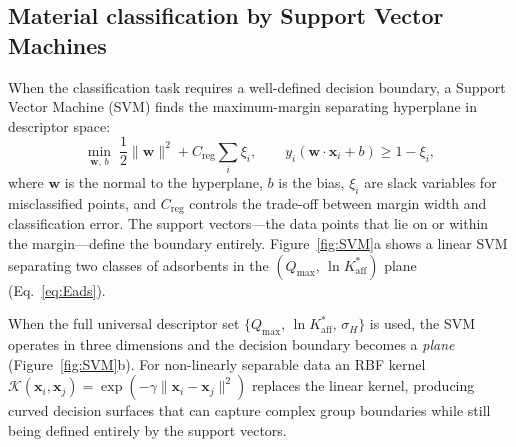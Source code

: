 \documentclass[journal=jacsat,manuscript=article]{achemso}
\begin{document}
	\subsection{Material classification by Support Vector Machines}
	\label{sec:SVM}

	When the classification task requires a well-defined decision boundary, a Support Vector Machine (SVM) finds the maximum-margin separating hyperplane in descriptor space:
	\begin{equation}
		\min_{\mathbf{w},\,b}\;
		\frac{1}{2}\|\mathbf{w}\|^2
		+ C_{\mathrm{reg}}\sum_{i}\xi_i,
		\qquad
		y_i(\mathbf{w}\cdot\mathbf{x}_i + b) \ge 1 - \xi_i,
		\label{eq:SVM}
	\end{equation}
	where $\mathbf{w}$ is the normal to the hyperplane, $b$ is the bias, $\xi_i$ are slack variables for misclassified points, and $C_{\mathrm{reg}}$ controls the trade-off between margin width and classification error. The support vectors---the data points that lie on or within the margin---define the boundary entirely. Figure~\ref{fig:SVM}a shows a linear SVM separating two classes of adsorbents in the $(Q_{\max},\, \ln K_{\mathrm{aff}}^{\ast})$ plane (Eq.~\eqref{eq:Eads}).

	When the full universal descriptor set $\{Q_{\max},\, \ln K_{\mathrm{aff}}^{\ast},\, \sigma_H\}$ is used, the SVM operates in three dimensions and the decision boundary becomes a \emph{plane} (Figure~\ref{fig:SVM}b). For non-linearly separable data an RBF kernel $\mathcal{K}(\mathbf{x}_i, \mathbf{x}_j) = \exp(-\gamma\|\mathbf{x}_i - \mathbf{x}_j\|^2)$ replaces the linear kernel, producing curved decision surfaces that can capture complex group boundaries while still being defined entirely by the support vectors.
\end{document}
